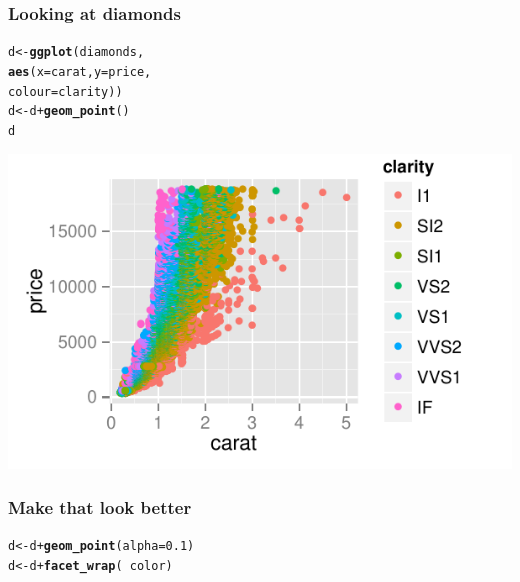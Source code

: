 \documentclass{beamer}\usepackage{graphicx, color}
\makeatletter
\def\maxwidth{ %
  \ifdim\Gin@nat@width>\linewidth
    \linewidth
  \else
    \Gin@nat@width
  \fi
}
\newcommand{\hlfunctioncall}[1]{\textcolor[rgb]{0.501960784313725,0,0.329411764705882}{\textbf{#1}}}%
\newenvironment{kframe}{%
 \def\at@end@of@kframe{}%
 \ifinner\ifhmode%
  \def\at@end@of@kframe{\end{minipage}}%
  \begin{minipage}{\columnwidth}%
 \fi\fi%
 \def\FrameCommand##1{\hskip\@totalleftmargin \hskip-\fboxsep
 \colorbox{shadecolor}{##1}\hskip-\fboxsep
     \hskip-\linewidth \hskip-\@totalleftmargin \hskip\columnwidth}%
 \MakeFramed {\advance\hsize-\width
   \@totalleftmargin\z@ \linewidth\hsize
   \@setminipage}}%
 {\par\unskip\endMakeFramed%
 \at@end@of@kframe}
\newenvironment{knitrout}{}{} %
\makeatother
\begin{document}
\begin{frame}[fragile]
  \frametitle{Looking at diamonds}
\begin{knitrout}
\color{fgcolor}\begin{kframe}
\begin{alltt}
d <- \hlfunctioncall{ggplot}(diamonds, 
            \hlfunctioncall{aes}(x = carat, y = price, 
                colour = clarity))
d <- d + \hlfunctioncall{geom_point}()
d
\end{alltt}
\end{kframe}
\includegraphics[width=\maxwidth]{figure/dia} 

\end{knitrout}


\end{frame}

\begin{frame}[fragile]
  \frametitle{Make that look better}
\begin{knitrout}
\color{fgcolor}\begin{kframe}
\begin{alltt}
d <- d + \hlfunctioncall{geom_point}(alpha = 0.1)
d <- d + \hlfunctioncall{facet_wrap}(~ color)
\end{alltt}
\end{kframe}
\end{knitrout}


\end{frame}
\end{document}
